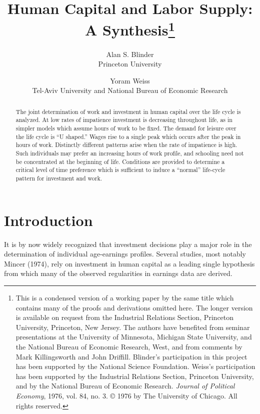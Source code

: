 \documentclass[11pt,fleqn]{article}
\begin{document}
\title{Human Capital and Labor Supply: A Synthesis\thanks{This is a condensed version of a working paper by the same title which contains many of the proofs and derivations omitted here. The longer version is available on request from the Industrial Relations Section, Princeton University, Princeton, New Jersey. The authors have benefited from seminar presentations at the University of Minnesota, Michigan State University, and the National Bureau of Economic Research, West, and from comments by Mark Killingsworth and John Driffill. Blinder's participation in this project has been supported by the National Science Foundation. Weiss's participation has been supported by the Industrial Relations Section, Princeton University, and by the National Bureau of Economic Research. \newline \textit{Journal of Political Economy}, 1976, vol. 84, no. 3. \copyright{} 1976 by The University of Chicago. All rights reserved.}}
\author{Alan S. Blinder \\ \small Princeton University \and Yoram Weiss \\ \small Tel-Aviv University and National Bureau of Economic Research}
\date{}
\maketitle

\begin{abstract}
The joint determination of work and investment in human capital over the life cycle is analyzed. At low rates of impatience investment is decreasing throughout life, as in simpler models which assume hours of work to be fixed. The demand for leisure over the life cycle is ``U shaped.'' Wages rise to a single peak which occurs after the peak in hours of work. Distinctly different patterns arise when the rate of impatience is high. Such individuals may prefer an increasing hours of work profile, and schooling need not be concentrated at the beginning of life. Conditions are provided to determine a critical level of time preference which is sufficient to induce a ``normal'' life-cycle pattern for investment and work.
\end{abstract}

\section{Introduction}

It is by now widely recognized that investment decisions play a major role in the determination of individual age-earnings profiles. Several studies, most notably Mincer (1974), rely on investment in human capital as a leading single hypothesis from which many of the observed regularities in earnings data are derived.
\end{document}
